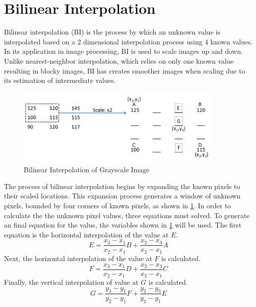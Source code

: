 \section{Bilinear Interpolation}
Bilinear interpolation (BI) is the process by which an unknown value is interpolated based on a 2 dimensional interpolation process using 4 known values.  In its application in image processing, BI is used to scale images up and down.  Unlike nearest-neighbor interpolation, which relies on only one known value resulting in blocky images, BI has creates smoother images when scaling due to its estimation of intermediate values.

\begin{figure}[ht]
  \centering
  \includegraphics[width=0.9\textwidth]{./img/bilinear_example.PNG}
  \caption{Bilinear Interpolation of Grayscale Image}
  \label{fig:bilinearExample}
\end{figure}
The process of bilinear interpolation begins by expanding the known pixels to their scaled locations.  This expansion process generates a window of unknown pixels, bounded by four corners of known pixels, as shown in \ref{fig:bilinearExample}.  In order to calculate the the unknown pixel values, three equations must solved.  To generate an final equation for the value, the variables shown in \ref{fig:bilinearExample} will be used.  The first equation is the horizontal interpolation of the value at $E$.
\begin{equation}
  E = \frac{x_3-x_1}{x_2-x_1}B + \frac{x_2-x_3}{x_2-x_1}A
  \label{eqn:E}
\end{equation}
Next, the horizontal interpolation of the value at $F$ is calculated.
\begin{equation}
  F = \frac{x_3-x_1}{x_2-x_1}D + \frac{x_2-x_3}{x_2-x_1}C
  \label{eqn:F}
\end{equation}
Finally, the vertical interpolation of value at $G$ is calculated.
\begin{equation}
  G = \frac{y_3-y_1}{y_2-y_1}F + \frac{y_2-y_3}{y_2-y_1}E
  \label{eqn:G}
\end{equation}

